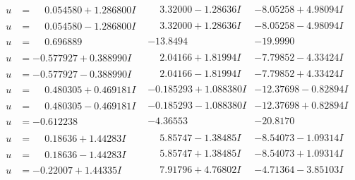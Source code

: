\documentclass[1p]{elsarticle_modified}
\theoremstyle{definition}
\begin{document}
$$\begin{array}{c|c|c}
\begin{aligned}
u &= \phantom{-}0.054580 + 1.286800 I\end{aligned}
 & \phantom{-}3.32000 - 1.28636 I & -8.05258 + 4.98094 I \\ \hline\begin{aligned}
u &= \phantom{-}0.054580 - 1.286800 I\end{aligned}
 & \phantom{-}3.32000 + 1.28636 I & -8.05258 - 4.98094 I \\ \hline\begin{aligned}
u &= \phantom{-}0.696889\phantom{ +0.000000I}\end{aligned}
 & -13.8494\phantom{ +0.000000I} & -19.9990\phantom{ +0.000000I} \\ \hline\begin{aligned}
u &= -0.577927 + 0.388990 I\end{aligned}
 & \phantom{-}2.04166 + 1.81994 I & -7.79852 - 4.33424 I \\ \hline\begin{aligned}
u &= -0.577927 - 0.388990 I\end{aligned}
 & \phantom{-}2.04166 - 1.81994 I & -7.79852 + 4.33424 I \\ \hline\begin{aligned}
u &= \phantom{-}0.480305 + 0.469181 I\end{aligned}
 & -0.185293 + 1.088380 I & -12.37698 - 0.82894 I \\ \hline\begin{aligned}
u &= \phantom{-}0.480305 - 0.469181 I\end{aligned}
 & -0.185293 - 1.088380 I & -12.37698 + 0.82894 I \\ \hline\begin{aligned}
u &= -0.612238\phantom{ +0.000000I}\end{aligned}
 & -4.36553\phantom{ +0.000000I} & -20.8170\phantom{ +0.000000I} \\ \hline\begin{aligned}
u &= \phantom{-}0.18636 + 1.44283 I\end{aligned}
 & \phantom{-}5.85747 - 1.38485 I & -8.54073 - 1.09314 I \\ \hline\begin{aligned}
u &= \phantom{-}0.18636 - 1.44283 I\end{aligned}
 & \phantom{-}5.85747 + 1.38485 I & -8.54073 + 1.09314 I \\ \hline\begin{aligned}
u &= -0.22007 + 1.44335 I\end{aligned}
 & \phantom{-}7.91796 + 4.76802 I & -4.71364 - 3.85103 I \\ \hline\begin{aligned}

\end{aligned}
\end{array}$$
\end{document}
